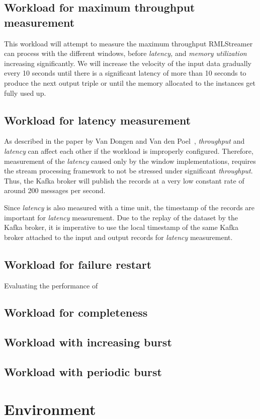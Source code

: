 \subsection{Workload for maximum throughput measurement}
This workload will attempt to measure the maximum throughput RMLStreamer can 
process with the different windows, before \emph{latency,} and \emph{memory utilization}
increasing significantly. We will increase the velocity of the input data gradually 
every 10 seconds until there is a significant latency of more than 10 seconds to produce
the next output triple or until the memory allocated to the instances get fully used up. 


\subsection{Workload for latency measurement}
As described in the paper by Van Dongen and Van den Poel~\cite{evalution_of_spe}, 
\emph{throughput} and \emph{latency} can affect each other if the workload is 
improperly configured. Therefore, measurement of the \emph{latency} caused only 
by the window implementations, requires the stream processing framework to not be 
stressed under significant \emph{throughput}. Thus, the Kafka broker will 
publish the records at a very low constant rate of around 200 messages per second. 

Since \emph{latency} is also measured with a time unit, the timestamp of the 
records are important for \emph{latency} measurement. Due to the replay of the dataset 
by the Kafka broker, it is imperative to use the local timestamp of the same Kafka broker
attached to the input and output records for \emph{latency} 
measurement\cite{latency_measurement_kafka}.

\subsection{Workload for failure restart}
Evaluating the performance of 


\subsection{Workload for completeness}

\subsection{Workload with increasing burst }

\subsection{Workload with periodic burst}


\section{Environment}




